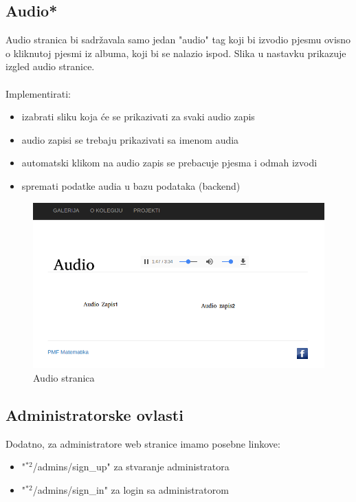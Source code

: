 \documentclass[]{article}
\begin{document}
\subsection{Audio*}
Audio stranica bi sadržavala samo jedan "audio" tag koji bi izvodio pjesmu ovisno o kliknutoj pjesmi iz albuma, koji bi se nalazio ispod. Slika u nastavku prikazuje izgled audio stranice.
\\
\\
Implementirati:
\begin{itemize}
	\item izabrati sliku koja će se prikazivati za svaki audio zapis
	\item audio zapisi se trebaju prikazivati sa imenom audia
	\item automatski klikom na audio zapis se prebacuje pjesma i odmah izvodi
	\item spremati podatke audia u bazu podataka (backend)
\end{itemize}

\begin{figure}[h]
	\centering
	\includegraphics[scale=0.3]{audio}
	\caption{Audio stranica}
	\label{fig:mesh1}
\end{figure}

\newpage

\subsection{Administratorske ovlasti}
Dodatno, za administratore web stranice imamo posebne linkove:
\begin{itemize}
	\item "$^{*2}$/admins/sign\_up" za stvaranje administratora
	\item "$^{*2}$/admins/sign\_in" za login sa administratorom
\end{itemize}
\end{document}
